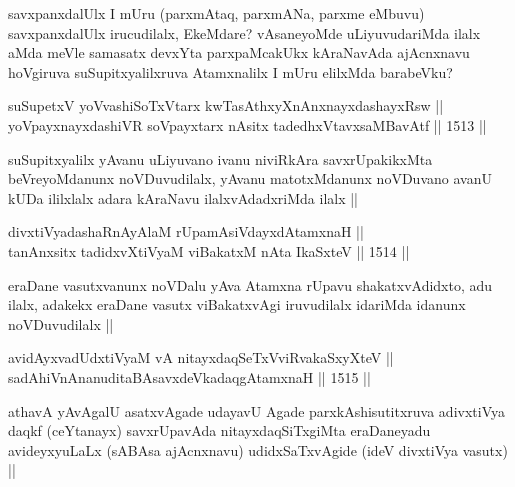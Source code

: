 \begin{artha}
savxpanxdalUlx I mUru (parxmAtaq, parxmANa, parxme eMbuvu) savxpanxdalUlx irucudilalx, EkeMdare? vAsaneyoMde uLiyuvudariMda ilalx aMda meVle samasatx devxYta parxpaMcakUkx kAraNavAda ajAcnxnavu hoVgiruva suSupitxyalilxruva Atamxnalilx I mUru elilxMda barabeVku? 
\end{artha}

\begin{shl}
suSupetxV yoV\s vashiSoTxV\s tarx kwTasAthxyXnAnxnayxdashayxRsw || \\
yoV\s payxnayxdashiVR soV\s payxtarx nAsitx tadedhxVtavxsaMBavAtf ||  1513 ||  
\end{shl}

\begin{artha}
suSupitxyalilx yAvanu uLiyuvano ivanu niviRkAra savxrUpakikxMta beVreyoMdanunx noVDuvudilalx, yAvanu matotxMdanunx noVDuvano avanU kUDa ililxlalx adara kAraNavu ilalxvAdadxriMda ilalx ||
\end{artha}

\begin{shl}
divxtiVyadashaRnAyAlaM rUpamAsiVdayxdAtamxnaH || \\
tanAnxsitx tadidxvXtiVyaM viBakatxM nAta IkaSxteV ||  1514 ||  
\end{shl}

\begin{artha}
eraDane vasutxvanunx noVDalu yAva Atamxna rUpavu shakatxvAdidxto, adu ilalx, adakekx eraDane vasutx viBakatxvAgi iruvudilalx idariMda idanunx noVDuvudilalx ||
\end{artha}

\begin{shl}
avidAyxvadUdxtiVyaM vA nitayxdaqSeTxVviRvakaSxyXteV ||  \\
sadAhiVnAnanuditaBAsavxdeVkadaqgAtamxnaH ||  1515 ||  
\end{shl}

\begin{artha}
athavA yAvAgalU asatxvAgade udayavU Agade parxkAshisutitxruva adivxtiVya daqkf (ceYtanayx) savxrUpavAda nitayxdaqSiTxgiMta eraDaneyadu avideyxyuLaLx (sABAsa ajAcnxnavu) udidxSaTxvAgide (ideV divxtiVya vasutx) ||
\end{artha}



